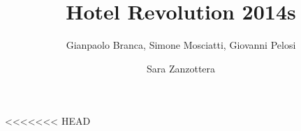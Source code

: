 \documentclass[12pt]{article}
\begin{document}
\title{Hotel Revolution 2014s}
\author{Gianpaolo Branca, Simone Mosciatti,  Giovanni Pelosi \and Sara Zanzottera}

\maketitle





<<<<<<< HEAD
\end{document}
